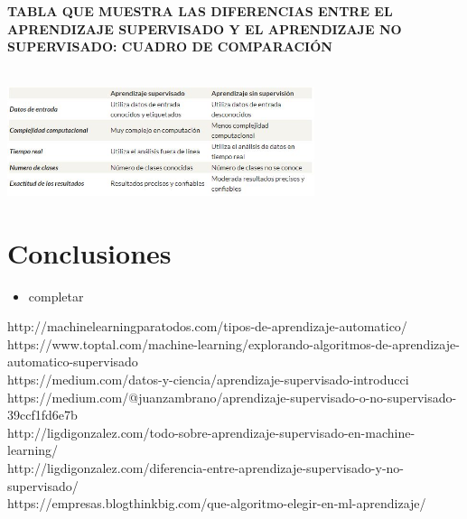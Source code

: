 \documentclass[%
 reprint,
 amsmath,amssymb,
 aps,
]{revtex4-1}
\begin{document}
\textbf{}\\  
\textbf{}\\ 
\textbf{TABLA QUE MUESTRA LAS DIFERENCIAS ENTRE EL APRENDIZAJE SUPERVISADO Y EL APRENDIZAJE NO SUPERVISADO: CUADRO DE COMPARACIÓN}\\  
\textbf{}\\ 
 \begin{center}
\includegraphics[width=9cm]{./Imagenes/tabla}
\end{center}
\section{Conclusiones}

\begin{itemize}
\item 
completar

\end{itemize}

\newpage

\begin{thebibliography}{99}
http://machinelearningparatodos.com/tipos-de-aprendizaje-automatico/\\
https://www.toptal.com/machine-learning/explorando-algoritmos-de-aprendizaje-automatico-supervisado\\
https://medium.com/datos-y-ciencia/aprendizaje-supervisado-introducci%
https://medium.com/@juanzambrano/aprendizaje-supervisado-o-no-supervisado-39ccf1fd6e7b\\
http://ligdigonzalez.com/todo-sobre-aprendizaje-supervisado-en-machine-learning/\\
http://ligdigonzalez.com/diferencia-entre-aprendizaje-supervisado-y-no-supervisado/\\
https://empresas.blogthinkbig.com/que-algoritmo-elegir-en-ml-aprendizaje/\\



\end{thebibliography}
\end{document}
